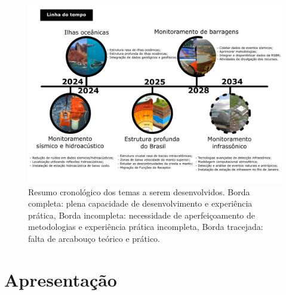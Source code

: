 \documentclass[10pt,a4paper,oneside]{book}
\begin{document}
\begin{landscape}
\begin{figure}[tb]
\begin{center}
\includegraphics[width=\pagewidth]{images/linha_do_projeto.png}
\end{center}
\caption*{Resumo cronológico dos temas a serem desenvolvidos. Borda completa: plena capacidade de desenvolvimento e experiência prática, Borda incompleta: necessidade de aperfeiçoamento de metodologias e experiência prática incompleta, Borda tracejada: falta de arcabouço teórico e prático.}
\label{fig_tempo_linha}
\end{figure}
\end{landscape}
\tableofcontents

\mainmatter
\pagestyle{fancy}

\chapter{Apresentação}
\end{document}
